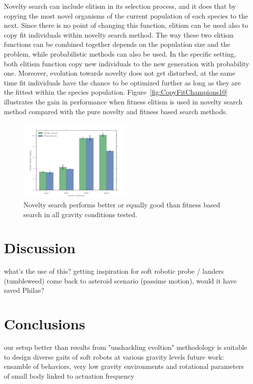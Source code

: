 \documentclass{sig-alternate}
\begin{document}
Novelty search can include elitism in its selection process, and it does that by copying the most novel organisms of the current population of each species to the next. Since there is no point of changing this function, elitism can be used also to copy fit individuals within novelty search method. The way these two elitism functions can be combined together depends on the population size and the problem, while probabilistic methods can also be used. In the specific setting, both elitism function copy new individuals to the new generation with probability one. Moreover, evolution towards novelty does not get disturbed, at the same time fit individuals have the chance to be optimized further as long as they are the fittest within the species population. Figure~\ref{fig:CopyFitChampions10} illustrates the gain in performance when fitness elitism is used in novelty search method compared with the pure novelty and fitness based search methods.


\begin{figure}[h!]
\centering
\includegraphics[width=0.5\textwidth]{../Figures/Results/GravityExperiment.pdf}
\caption{Novelty search performs better or equally good than fitness based search in all gravity conditions tested.}
\label{fig:gravityConditions}
\end{figure}

\section{Discussion}
what's the use of this?
getting inspiration for soft robotic probe / landers (tumbleweed)
come back to asteroid scenario (passime motion), would it have saved Philae?

\section{Conclusions}
our setup better than results from "unshackling evoltion"
methodology is suitable to design diverse gaits of soft robots at various gravity levels
future work: ensamble of behaviors, very low gravity environments and rotational parameters of small body linked to actuation frequency



\end{document}
